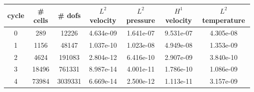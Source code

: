 \documentclass[10pt]{report}
\begin{document}
\begin{table}[H]
\begin{center}
\begin{tabular}{|c|c|c|c|c|c|c|} \hline
cycle & \# cells & \# dofs & $L^2$ velocity & $L^2$ pressure & $H^1$ velocity & $L^2$ temperature\\ \hline
0 & 289 & 12226 & 4.634e-09 & 1.641e-07 & 9.531e-07 & 4.305e-08\\ \hline
1 & 1156 & 48147 & 1.037e-10 & 1.023e-08 & 4.949e-08 & 1.353e-09\\ \hline
2 & 4624 & 191083 & 2.804e-12 & 6.416e-10 & 2.907e-09 & 3.840e-10\\ \hline
3 & 18496 & 761331 & 8.987e-14 & 4.001e-11 & 1.786e-10 & 1.086e-09\\ \hline
4 & 73984 & 3039331 & 6.669e-14 & 2.500e-12 & 1.113e-11 & 3.157e-09\\ \hline
\end{tabular}
\end{center}
\end{table}
\end{document}
